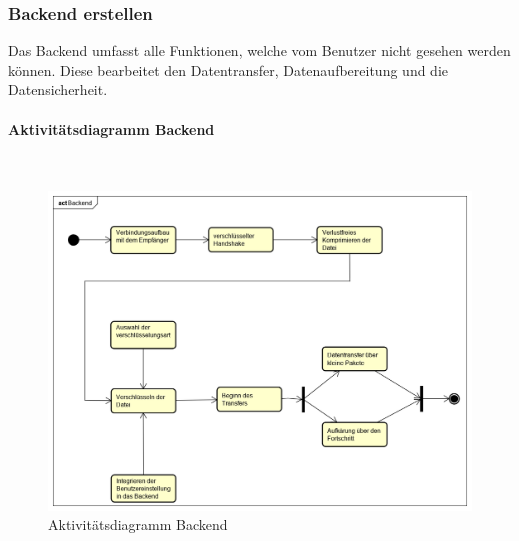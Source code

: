 \subsubsection{Backend erstellen}
Das Backend umfasst alle Funktionen, welche vom Benutzer nicht gesehen werden können. Diese bearbeitet den Datentransfer, Datenaufbereitung und die Datensicherheit.

\paragraph{Aktivitätsdiagramm Backend}\mbox{}\\
\begin{figure}[H]
	\centering
	\includegraphics[width= 0.9\linewidth]{diagramms/activity/Backend.png}
	\caption{Aktivitätsdiagramm Backend}
\end{figure}
\newpage
